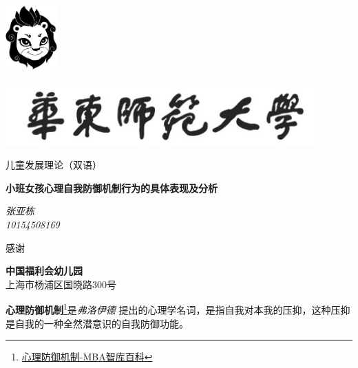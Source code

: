 \documentclass[a4paper, oneside, 11pt, UTF8]{ctexart}
\begin{document}
\begin{titlepage}
	\centering
	\includegraphics[width=0.15\textwidth]{image/lion.jpg}\par\vspace{1cm}
	\centering\includegraphics[width=0.9\textwidth]{image/logo-ecnu.jpg} \par
	\vspace{1cm}
	{\scshape\Large 儿童发展理论（双语）\par}
	\vspace{1.5cm}
	{\huge\bfseries 小班女孩心理自我防御机制行为的具体表现及分析\par}
	\vspace{2cm}
	{\Large\itshape 张亚栋\\10154508169\par}
	\vfill
	感谢\par
	\textbf{中国福利会幼儿园}\\上海市杨浦区国晓路300号

	\vfill

\end{titlepage}
\setcounter{page}{1} %
 \textbf{心理防御机制}\footnote{\href{http://wiki.mbalib.com/wiki/\%E5\%BF\%83\%E7\%90\%86\%E9\%98\%B2\%E5\%BE\%A1\%E6\%9C\%BA\%E5\%88\%B6}{心理防御机制-MBA智库百科}}是\textit{弗洛伊德} 提出的心理学名词，是指自我对本我的压抑，这种压抑是自我的一种全然潜意识的自我防御功能。
\end{document}
